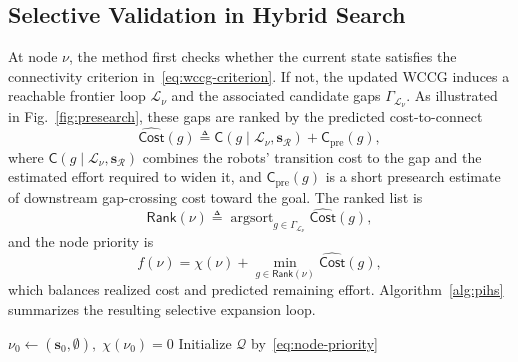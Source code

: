 \subsection{Selective Validation in Hybrid Search}
\label{subsec:pihs}
At node $\nu$, the method first checks whether the current state satisfies the
connectivity criterion in~\eqref{eq:wccg-criterion}. If not, the updated WCCG
induces a reachable frontier loop $\mathcal{L}_\nu$ and the associated
candidate gaps $\Gamma_{\mathcal{L}_\nu}$. As illustrated in
Fig.~\ref{fig:presearch}, these gaps are ranked by the predicted
cost-to-connect
\begin{equation}
\label{eq:gap-score}
\widehat{\mathsf{Cost}}(g)
\triangleq
\mathsf{C}(g \mid \mathcal{L}_\nu,\mathbf{s}_{\mathcal{R}})
+
\mathsf{C}_{\mathrm{pre}}(g),
\end{equation}
where $\mathsf{C}(g \mid \mathcal{L}_\nu,\mathbf{s}_{\mathcal{R}})$ combines
the robots' transition cost to the gap and the estimated effort required to
widen it, and $\mathsf{C}_{\mathrm{pre}}(g)$ is a short presearch estimate of
downstream gap-crossing cost toward the goal. The ranked list is
\begin{equation}
\label{eq:gap-rank}
\mathsf{Rank}(\nu)
\triangleq
\operatorname{argsort}_{g \in \Gamma_{\mathcal{L}_\nu}}
\widehat{\mathsf{Cost}}(g),
\end{equation}
and the node priority is
\begin{equation}
\label{eq:node-priority}
f(\nu)
=
\chi(\nu)
+
\min_{g \in \mathsf{Rank}(\nu)} \widehat{\mathsf{Cost}}(g),
\end{equation}
which balances realized cost and predicted remaining effort.
Algorithm~\ref{alg:pihs} summarizes the resulting selective expansion loop.

\begin{algorithm}[t!]
\caption{Selective Validation in Physics-Informed Hybrid Search}
\label{alg:pihs}
\SetAlgoLined
{}
\KwOut{$\pi^\star$}
$\nu_0\gets(\mathbf{s}_0,\emptyset),\;\chi(\nu_0)=0$\;
Initialize $\mathcal{Q}$ by~\eqref{eq:node-priority}\;
\Return{$\pi^\star$}\;
\end{algorithm}

